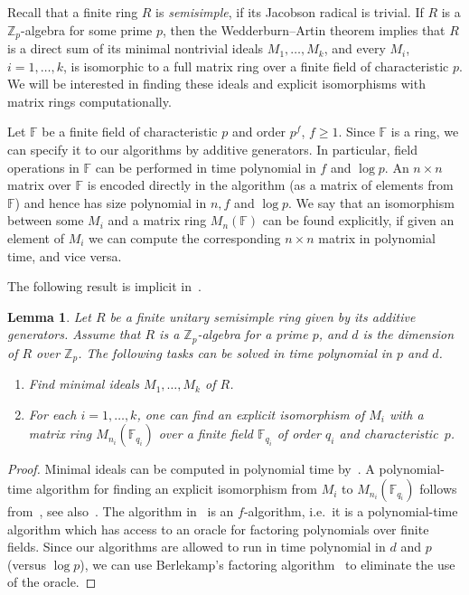 \documentclass{article}
\newtheorem{lemma}[theorem]{Lemma}
\begin{document}
Recall that a finite ring \( R \) is \emph{semisimple}, if its Jacobson radical is trivial. If \( R \) is a \( \mathbb{Z}_p \)-algebra for some prime \( p \),
then the Wedderburn--Artin theorem implies that \( R \) is a direct sum of its minimal nontrivial ideals \( M_1, \dots, M_k \),
and every \( M_i \), \( i = 1, \dots, k \), is isomorphic to a full matrix ring over a finite field of characteristic \( p \).
We will be interested in finding these ideals and explicit isomorphisms with matrix rings computationally.

Let \( \mathbb{F} \) be a finite field of characteristic \( p \) and order \( p^f \), \( f \geq 1 \).
Since \( \mathbb{F} \) is a ring, we can specify it to our algorithms by additive generators. In particular, field operations
in \( \mathbb{F} \) can be performed in time polynomial in \( f \) and \( \log p \).
An \( n \times n \) matrix over \( \mathbb{F} \) is encoded directly in the algorithm (as a matrix of elements from~\( \mathbb{F} \))
and hence has size polynomial in \( n, f \) and \( \log p \).
We say that an isomorphism between some \( M_i \) and a matrix ring \( M_n(\mathbb{F}) \) can be found explicitly,
if given an element of \( M_i \) we can compute the corresponding \( n \times n \) matrix in polynomial time, and vice versa.

The following result is implicit in~\cite{ronyai}.

\begin{lemma}\label{wedder}
	Let \( R \) be a finite unitary semisimple ring given by its additive generators.
	Assume that \( R \) is a \( \mathbb{Z}_p \)-algebra for a prime \( p \), and \( d \) is the dimension of \( R \) over \( \mathbb{Z}_p \).
	The following tasks can be solved in time polynomial in \( p \) and \( d \).
	\begin{enumerate}
		\item Find minimal ideals \( M_1, \dots, M_k \) of \( R \).
		\item For each \( i = 1, \dots, k \), one can find an explicit isomorphism of \( M_i \) with a matrix ring \( M_{n_i}(\mathbb{F}_{q_i}) \)
			over a finite field \( \mathbb{F}_{q_i} \) of order \( q_i \) and characteristic~\( p \).
	\end{enumerate}
\end{lemma}
\begin{proof}
	Minimal ideals can be computed in polynomial time by~\cite[Corollary~3.2]{ronyai}.
	A polynomial-time algorithm for finding an explicit isomorphism from \( M_i \) to \( M_{n_i}(\mathbb{F}_{q_i}) \)
	follows from~\cite[Theorem~5.2]{ronyai}, see also~\cite[Corollary~4.7]{ronyai}. The algorithm in~\cite[Theorem~5.2]{ronyai} is an \( f \)-algorithm,
	i.e.\ it is a polynomial-time algorithm which has access to an oracle for factoring polynomials over finite fields.
	Since our algorithms are allowed to run in time polynomial in \( d \) and \( p \) (versus \( \log p \)),
	we can use Berlekamp's factoring algorithm~\cite{berle} to eliminate the use of the oracle.
\end{proof}
\end{document}
